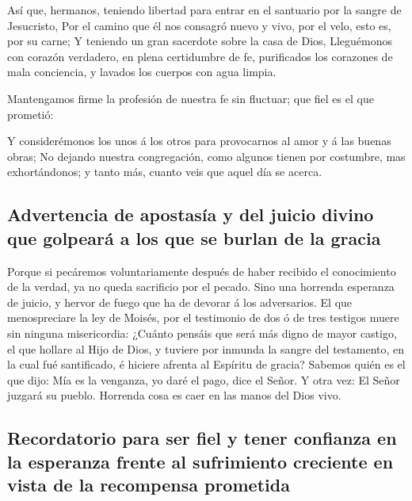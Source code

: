  Así que, hermanos, teniendo libertad para entrar en el
santuario por la sangre de Jesucristo,  Por el camino que
él nos consagró nuevo y vivo, por el velo, esto es, por su carne;
 Y teniendo un gran sacerdote sobre la casa de Dios,
 Lleguémonos con corazón verdadero, en plena certidumbre
de fe, purificados los corazones de mala conciencia, y lavados los
cuerpos con agua limpia.

 Mantengamos firme la profesión de nuestra fe sin
fluctuar; que fiel es el que prometió:

 Y considerémonos los unos á los otros para provocarnos
al amor y á las buenas obras;  No dejando nuestra
congregación, como algunos tienen por costumbre, mas exhortándonos; y
tanto más, cuanto veis que aquel día se acerca.

\hypertarget{advertencia-de-apostasuxeda-y-del-juicio-divino-que-golpearuxe1-a-los-que-se-burlan-de-la-gracia}{%
\subsection{Advertencia de apostasía y del juicio divino que golpeará a
los que se burlan de la
gracia}\label{advertencia-de-apostasuxeda-y-del-juicio-divino-que-golpearuxe1-a-los-que-se-burlan-de-la-gracia}}

 Porque si pecáremos voluntariamente después de haber
recibido el conocimiento de la verdad, ya no queda sacrificio por el
pecado.  Sino una horrenda esperanza de juicio, y hervor
de fuego que ha de devorar á los adversarios.  El que
menospreciare la ley de Moisés, por el testimonio de dos ó de tres
testigos muere sin ninguna misericordia:  ¿Cuánto pensáis
que será más digno de mayor castigo, el que hollare al Hijo de Dios, y
tuviere por inmunda la sangre del testamento, en la cual fué
santificado, é hiciere afrenta al Espíritu de gracia? 
Sabemos quién es el que dijo: Mía es la venganza, yo daré el pago, dice
el Señor. Y otra vez: El Señor juzgará su pueblo. 
Horrenda cosa es caer en las manos del Dios vivo.

\hypertarget{recordatorio-para-ser-fiel-y-tener-confianza-en-la-esperanza-frente-al-sufrimiento-creciente-en-vista-de-la-recompensa-prometida}{%
\subsection{Recordatorio para ser fiel y tener confianza en la esperanza
frente al sufrimiento creciente en vista de la recompensa
prometida}\label{recordatorio-para-ser-fiel-y-tener-confianza-en-la-esperanza-frente-al-sufrimiento-creciente-en-vista-de-la-recompensa-prometida}}

